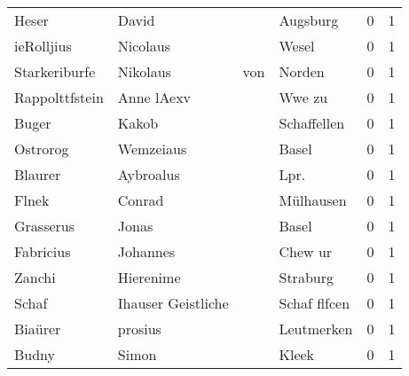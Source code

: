 \documentclass[10pt,a4paper,landscape]{article}
\begin{document}
\begin{longtable}{llllrr}
                    Heser &                              David &             &                                    Augsburg &          0 &         1 \\
               ieRolljius &                           Nicolaus &             &                                       Wesel &          0 &         1 \\
            Starkeriburfe &                           Nikolaus &         von &                                      Norden &          0 &         1 \\
           Rappolttfstein &                         Anne lAexv &             &                                      Wwe zu &          0 &         1 \\
                    Buger &                              Kakob &             &                                 Schaffellen &          0 &         1 \\
                 Ostrorog &                          Wemzeiaus &             &                                       Basel &          0 &         1 \\
                  Blaurer &                          Aybroalus &             &                                       Lpr.  &          0 &         1 \\
                    Flnek &                             Conrad &             &                                   Mülhausen &          0 &         1 \\
                Grasserus &                              Jonas &             &                                       Basel &          0 &         1 \\
                Fabricius &                           Johannes &             &                                     Chew ur &          0 &         1 \\
                   Zanchi &                          Hierenime &             &                                    Straburg &          0 &         1 \\
                    Schaf &                 Ihauser Geistliche &             &                                Schaf flfcen &          0 &         1 \\
                  Biaürer &                            prosius &             &                                  Leutmerken &          0 &         1 \\
                    Budny &                              Simon &             &                                       Kleek &          0 &         1 \\

\end{longtable}
\end{document}
